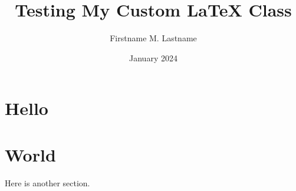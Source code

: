 \documentclass{cicirello}
\title{Testing My Custom LaTeX Class}
\author{Firstname M. Lastname}
\date{January 2024}
\begin{document}
\maketitle

\section{Hello}

\lipsum[2-6]

\section{World}

Here is another section.
\end{document}

